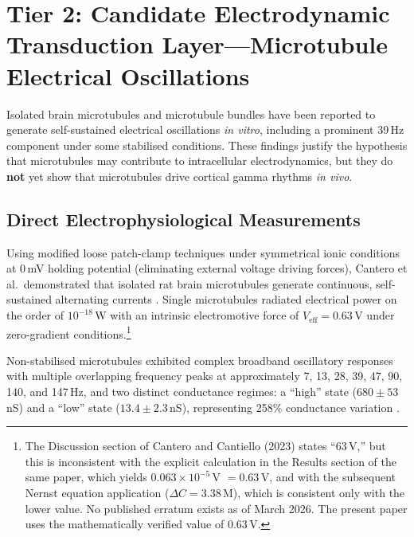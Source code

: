 \documentclass[10pt, a4paper, twocolumn]{article}
\begin{document}
\section{Tier 2: Candidate Electrodynamic Transduction
Layer---Microtubule Electrical Oscillations}

Isolated brain microtubules and microtubule bundles have been reported to
generate self-sustained electrical oscillations \emph{in vitro},
including a prominent 39\,Hz component under some stabilised conditions.
These findings justify the hypothesis that microtubules may contribute
to intracellular electrodynamics, but they do \textbf{not} yet show
that microtubules drive cortical gamma rhythms \emph{in vivo}.

\subsection{Direct Electrophysiological Measurements}

Using modified loose patch-clamp techniques under symmetrical ionic
conditions at 0\,mV holding potential (eliminating external voltage
driving forces), Cantero et al.\ demonstrated that isolated rat brain
microtubules generate continuous, self-sustained alternating currents
\cite{cantero2018,cantero2023}. Single microtubules radiated electrical
power on the order of $10^{-18}$\,W with an intrinsic electromotive
force of $V_{\text{eff}} = 0.63$\,\textmu V under zero-gradient
conditions.\footnote{The Discussion section of Cantero and Cantiello
(2023) states ``63\,\textmu V,'' but this is inconsistent with the
explicit calculation in the Results section of the same paper, which
yields $0.063 \times 10^{-5}$\,V $= 0.63$\,\textmu V, and with the
subsequent Nernst equation application ($\Delta C = 3.38$\,\textmu M),
which is consistent only with the lower value. No published erratum
exists as of March 2026. The present paper uses the mathematically
verified value of 0.63\,\textmu V.}

Non-stabilised microtubules exhibited complex broadband oscillatory
responses with multiple overlapping frequency peaks at approximately 7,
13, 28, 39, 47, 90, 140, and 147\,Hz, and two distinct conductance
regimes: a ``high'' state ($680 \pm 53$\,nS) and a ``low'' state
($13.4 \pm 2.3$\,nS), representing 258\% conductance variation
\cite{cantero2018}.
\end{document}
